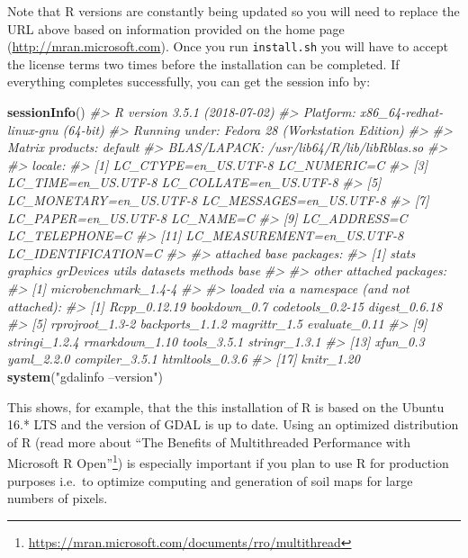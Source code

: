 \documentclass[11pt]{krantz}
\newenvironment{Shaded}{\begin{snugshade}}{\end{snugshade}}
\newcommand{\CommentTok}[1]{\textcolor[rgb]{0.37,0.37,0.37}{\textit{#1}}}
\newcommand{\KeywordTok}[1]{\textcolor[rgb]{0.27,0.27,0.27}{\textbf{#1}}}
\newcommand{\NormalTok}[1]{#1}
\newcommand{\StringTok}[1]{\textcolor[rgb]{0.5,0.5,0.5}{#1}}
\renewcommand{\href}[2]{#2\footnote{\url{#1}}}
\theoremstyle{definition}
\theoremstyle{definition}
\theoremstyle{definition}
\theoremstyle{remark}
\begin{document}
Note that R versions are constantly being updated so you will need to
replace the URL above based on information provided on the home page
(\url{http://mran.microsoft.com}). Once you run \texttt{install.sh} you
will have to accept the license terms two times before the installation
can be completed. If everything completes successfully, you can get the
session info by:

\begin{Shaded}
\begin{Highlighting}[]
\KeywordTok{sessionInfo}\NormalTok{()}
\CommentTok{#> R version 3.5.1 (2018-07-02)}
\CommentTok{#> Platform: x86_64-redhat-linux-gnu (64-bit)}
\CommentTok{#> Running under: Fedora 28 (Workstation Edition)}
\CommentTok{#> }
\CommentTok{#> Matrix products: default}
\CommentTok{#> BLAS/LAPACK: /usr/lib64/R/lib/libRblas.so}
\CommentTok{#> }
\CommentTok{#> locale:}
\CommentTok{#>  [1] LC_CTYPE=en_US.UTF-8       LC_NUMERIC=C              }
\CommentTok{#>  [3] LC_TIME=en_US.UTF-8        LC_COLLATE=en_US.UTF-8    }
\CommentTok{#>  [5] LC_MONETARY=en_US.UTF-8    LC_MESSAGES=en_US.UTF-8   }
\CommentTok{#>  [7] LC_PAPER=en_US.UTF-8       LC_NAME=C                 }
\CommentTok{#>  [9] LC_ADDRESS=C               LC_TELEPHONE=C            }
\CommentTok{#> [11] LC_MEASUREMENT=en_US.UTF-8 LC_IDENTIFICATION=C       }
\CommentTok{#> }
\CommentTok{#> attached base packages:}
\CommentTok{#> [1] stats     graphics  grDevices utils     datasets  methods   base     }
\CommentTok{#> }
\CommentTok{#> other attached packages:}
\CommentTok{#> [1] microbenchmark_1.4-4}
\CommentTok{#> }
\CommentTok{#> loaded via a namespace (and not attached):}
\CommentTok{#>  [1] Rcpp_0.12.19     bookdown_0.7     codetools_0.2-15 digest_0.6.18   }
\CommentTok{#>  [5] rprojroot_1.3-2  backports_1.1.2  magrittr_1.5     evaluate_0.11   }
\CommentTok{#>  [9] stringi_1.2.4    rmarkdown_1.10   tools_3.5.1      stringr_1.3.1   }
\CommentTok{#> [13] xfun_0.3         yaml_2.2.0       compiler_3.5.1   htmltools_0.3.6 }
\CommentTok{#> [17] knitr_1.20}
\KeywordTok{system}\NormalTok{(}\StringTok{"gdalinfo --version"}\NormalTok{)}
\end{Highlighting}
\end{Shaded}

This shows, for example, that the this installation of R is based on the
Ubuntu 16.* LTS and the version of GDAL is up to date. Using an
optimized distribution of R (read more about
\href{https://mran.microsoft.com/documents/rro/multithread}{``The
Benefits of Multithreaded Performance with Microsoft R Open''}) is
especially important if you plan to use R for production purposes
i.e.~to optimize computing and generation of soil maps for large numbers
of pixels.
\end{document}
